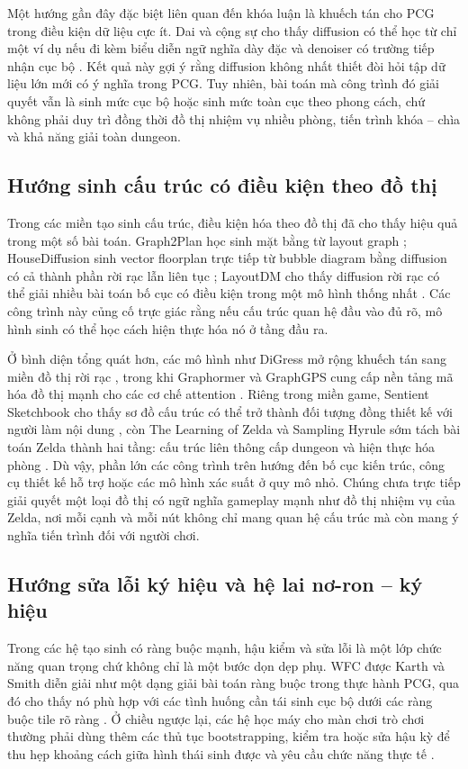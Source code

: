 \documentclass[oneside,a4paper,12pt]{extreport}
\begin{document}
Một hướng gần đây đặc biệt liên quan đến khóa luận là khuếch tán cho PCG trong điều kiện dữ liệu cực ít. Dai và cộng sự cho thấy diffusion có thể học từ chỉ một ví dụ nếu đi kèm biểu diễn ngữ nghĩa dày đặc và denoiser có trường tiếp nhận cục bộ \cite{dai2024singleexample}. Kết quả này gợi ý rằng diffusion không nhất thiết đòi hỏi tập dữ liệu lớn mới có ý nghĩa trong PCG. Tuy nhiên, bài toán mà công trình đó giải quyết vẫn là sinh mức cục bộ hoặc sinh mức toàn cục theo phong cách, chứ không phải duy trì đồng thời đồ thị nhiệm vụ nhiều phòng, tiến trình khóa -- chìa và khả năng giải toàn dungeon.

\subsection{Hướng sinh cấu trúc có điều kiện theo đồ thị}
Trong các miền tạo sinh cấu trúc, điều kiện hóa theo đồ thị đã cho thấy hiệu quả trong một số bài toán. Graph2Plan học sinh mặt bằng từ layout graph \cite{hu2020graph2plan}; HouseDiffusion sinh vector floorplan trực tiếp từ bubble diagram bằng diffusion có cả thành phần rời rạc lẫn liên tục \cite{shabani2023housediffusion}; LayoutDM cho thấy diffusion rời rạc có thể giải nhiều bài toán bố cục có điều kiện trong một mô hình thống nhất \cite{inoue2023layoutdm}. Các công trình này củng cố trực giác rằng nếu cấu trúc quan hệ đầu vào đủ rõ, mô hình sinh có thể học cách hiện thực hóa nó ở tầng đầu ra.

Ở bình diện tổng quát hơn, các mô hình như DiGress mở rộng khuếch tán sang miền đồ thị rời rạc \cite{vignac2023digress}, trong khi Graphormer và GraphGPS cung cấp nền tảng mã hóa đồ thị mạnh cho các cơ chế attention \cite{ying2021graphormer,rampasek2022gps}. Riêng trong miền game, Sentient Sketchbook cho thấy sơ đồ cấu trúc có thể trở thành đối tượng đồng thiết kế với người làm nội dung \cite{liapis2013sentient}, còn The Learning of Zelda và Sampling Hyrule sớm tách bài toán Zelda thành hai tầng: cấu trúc liên thông cấp dungeon và hiện thực hóa phòng \cite{summerville2015zelda,summerville2015samplinghyrule}. Dù vậy, phần lớn các công trình trên hướng đến bố cục kiến trúc, công cụ thiết kế hỗ trợ hoặc các mô hình xác suất ở quy mô nhỏ. Chúng chưa trực tiếp giải quyết một loại đồ thị có ngữ nghĩa gameplay mạnh như đồ thị nhiệm vụ của Zelda, nơi mỗi cạnh và mỗi nút không chỉ mang quan hệ cấu trúc mà còn mang ý nghĩa tiến trình đối với người chơi.

\subsection{Hướng sửa lỗi ký hiệu và hệ lai nơ-ron -- ký hiệu}
Trong các hệ tạo sinh có ràng buộc mạnh, hậu kiểm và sửa lỗi là một lớp chức năng quan trọng chứ không chỉ là một bước dọn dẹp phụ. WFC được Karth và Smith diễn giải như một dạng giải bài toán ràng buộc trong thực hành PCG, qua đó cho thấy nó phù hợp với các tình huống cần tái sinh cục bộ dưới các ràng buộc tile rõ ràng \cite{karth2021wfc}. Ở chiều ngược lại, các hệ học máy cho màn chơi trò chơi thường phải dùng thêm các thủ tục bootstrapping, kiểm tra hoặc sửa hậu kỳ để thu hẹp khoảng cách giữa hình thái sinh được và yêu cầu chức năng thực tế \cite{rodriguez2019bootstrapping}.
\end{document}
